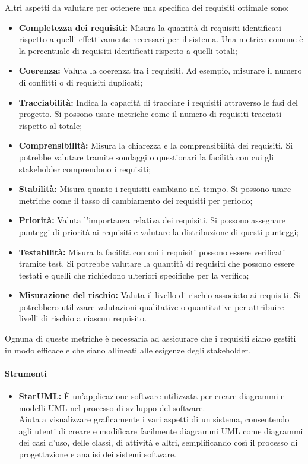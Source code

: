 Altri aspetti da valutare per ottenere una specifica dei requisiti ottimale sono:
\begin{itemize}
    \item \textbf{Completezza dei requisiti:} Misura la quantità di requisiti identificati rispetto a quelli effettivamente necessari per il sistema. Una metrica comune è la percentuale di requisiti identificati rispetto a quelli totali;
    \item \textbf{Coerenza:} Valuta la coerenza tra i requisiti. Ad esempio, misurare il numero di conflitti o di requisiti duplicati;
    \item \textbf{Tracciabilità:} Indica la capacità di tracciare i requisiti attraverso le fasi del progetto. Si possono usare metriche come il numero di requisiti tracciati rispetto al totale;
    \item \textbf{Comprensibilità:} Misura la chiarezza e la comprensibilità dei requisiti. Si potrebbe valutare tramite sondaggi o questionari la facilità con cui gli stakeholder comprendono i requisiti;
    \item \textbf{Stabilità:} Misura quanto i requisiti cambiano nel tempo. Si possono usare metriche come il tasso di cambiamento dei requisiti per periodo;
    \item \textbf{Priorità:} Valuta l'importanza relativa dei requisiti. Si possono assegnare punteggi di priorità ai requisiti e valutare la distribuzione di questi punteggi;
    \item \textbf{Testabilità:} Misura la facilità con cui i requisiti possono essere verificati tramite test. Si potrebbe valutare la quantità di requisiti che possono essere testati e quelli che richiedono ulteriori specifiche per la verifica;
    \item \textbf{Misurazione del rischio:} Valuta il livello di rischio associato ai requisiti. Si potrebbero utilizzare valutazioni qualitative o quantitative per attribuire livelli di rischio a ciascun requisito.
\end{itemize}
Ognuna di queste metriche è necessaria ad assicurare che i requisiti siano gestiti in modo efficace e che siano allineati alle esigenze degli stakeholder.

\paragraph{Strumenti}
\begin{itemize}
    \item \textbf{StarUML:}
    È un'applicazione software utilizzata per creare diagrammi e modelli UML nel processo di sviluppo del software. \\
    Aiuta a visualizzare graficamente i vari aspetti di un sistema, consentendo agli utenti di creare e modificare facilmente diagrammi UML come diagrammi dei casi d'uso, delle classi, di attività e altri, semplificando così il processo di progettazione e analisi dei sistemi software.
\end{itemize}


